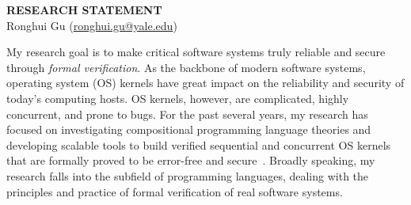 \documentclass[a4paper, 10pt]{article}
\newcommand*{\email}[1]{\normalsize\href{mailto:#1}{#1}}
\begin{document}
\thispagestyle{fancy}
\lhead{}
\rhead{}
\renewcommand{\headrulewidth}{0pt} 
\renewcommand{\footrulewidth}{0pt} 


\pagestyle{fancy}
\lhead{\textcolor{gray}{\it Ronghui Gu}}
\rhead{\textcolor{gray}{\thepage/\totalpages{}}}

\begin{small}

\begin{center}
{\LARGE \bf RESEARCH STATEMENT}\\
\vspace*{0.2cm}
{\normalsize Ronghui Gu (\email{ronghui.gu@yale.edu})}
\end{center}



My research goal is to make critical software systems truly reliable and secure through \emph{formal verification}.
As the backbone of 
modern software systems,
operating system (OS) kernels
  have great impact on the reliability and security of today's computing hosts. OS kernels, however, are complicated, highly concurrent, and prone to bugs.  For the past several years,  my research has focused on investigating compositional programming language theories and developing scalable tools to build verified sequential and concurrent OS kernels that are formally proved to be error-free and secure~\cite{popl15-gu, osdi16-gu, pldi16-security, pldi16-device}.
Broadly speaking, my research
falls into 
the subfield of programming languages,
dealing with the principles and practice of  formal verification
of real software systems.



\end{small}
\end{document}
